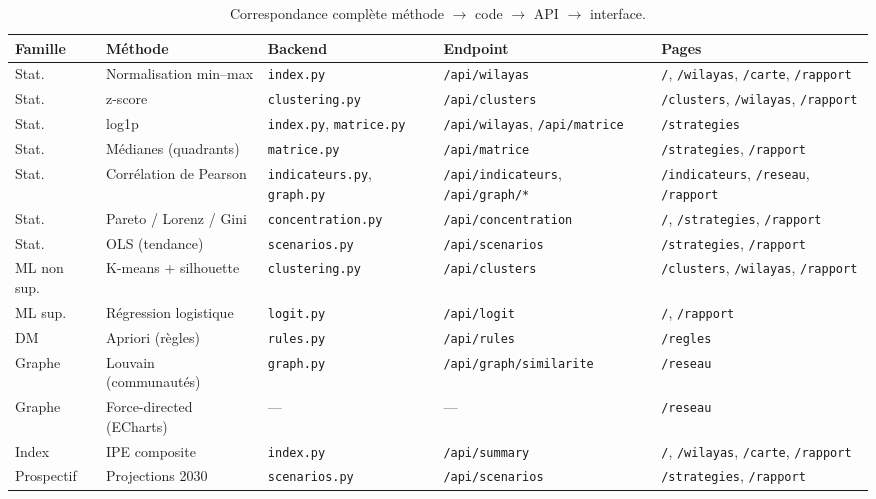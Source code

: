 \documentclass[11pt,a4paper]{article}
\newcommand{\txt}[1]{\texttt{#1}}
\begin{document}
\begin{table}[h!]
\centering
\footnotesize
\begin{tabularx}{\textwidth}{@{}l l l X X@{}}
\toprule
\textbf{Famille} & \textbf{Méthode} & \textbf{Backend} & \textbf{Endpoint} & \textbf{Pages} \\
\midrule
Stat. & Normalisation min--max & \txt{index.py} & \txt{/api/wilayas} & \txt{/}, \txt{/wilayas}, \txt{/carte}, \txt{/rapport} \\
Stat. & z-score & \txt{clustering.py} & \txt{/api/clusters} & \txt{/clusters}, \txt{/wilayas}, \txt{/rapport} \\
Stat. & log1p & \txt{index.py}, \txt{matrice.py} & \txt{/api/wilayas}, \txt{/api/matrice} & \txt{/strategies} \\
Stat. & Médianes (quadrants) & \txt{matrice.py} & \txt{/api/matrice} & \txt{/strategies}, \txt{/rapport} \\
Stat. & Corrélation de Pearson & \txt{indicateurs.py}, \txt{graph.py} & \txt{/api/indicateurs}, \txt{/api/graph/*} & \txt{/indicateurs}, \txt{/reseau}, \txt{/rapport} \\
Stat. & Pareto / Lorenz / Gini & \txt{concentration.py} & \txt{/api/concentration} & \txt{/}, \txt{/strategies}, \txt{/rapport} \\
Stat. & OLS (tendance) & \txt{scenarios.py} & \txt{/api/scenarios} & \txt{/strategies}, \txt{/rapport} \\
ML non sup. & K-means + silhouette & \txt{clustering.py} & \txt{/api/clusters} & \txt{/clusters}, \txt{/wilayas}, \txt{/rapport} \\
ML sup. & Régression logistique & \txt{logit.py} & \txt{/api/logit} & \txt{/}, \txt{/rapport} \\
DM & Apriori (règles) & \txt{rules.py} & \txt{/api/rules} & \txt{/regles} \\
Graphe & Louvain (communautés) & \txt{graph.py} & \txt{/api/graph/similarite} & \txt{/reseau} \\
Graphe & Force-directed (ECharts) & --- & --- & \txt{/reseau} \\
Index & IPE composite & \txt{index.py} & \txt{/api/summary} & \txt{/}, \txt{/wilayas}, \txt{/carte}, \txt{/rapport} \\
Prospectif & Projections 2030 & \txt{scenarios.py} & \txt{/api/scenarios} & \txt{/strategies}, \txt{/rapport} \\
\bottomrule
\end{tabularx}
\caption{Correspondance complète méthode $\to$ code $\to$ API $\to$ interface.}
\end{table}
\end{document}
